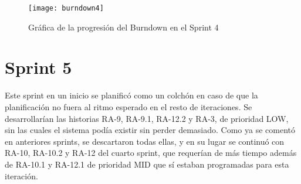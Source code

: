 \begin{figure}[h]
    \centering
    \texttt{[image: burndown4]}
    \caption[Burndown Sprint 4]{Gráfica de la progresión del Burndown en el Sprint 4}
	\label{fig:burndown4}
\end{figure}

\section{Sprint 5}

Este sprint en un inicio se planificó como un colchón en caso de que la planificación no fuera al ritmo esperado en el resto de iteraciones. Se desarrollarían las historias RA-9, RA-9.1, RA-12.2 y RA-3, de prioridad LOW, sin las cuales el sistema podía existir sin perder demasiado. Como ya se comentó en anteriores sprints, se descartaron todas ellas, y en su lugar se continuó con RA-10, RA-10.2 y RA-12 del cuarto sprint, que requerían de más tiempo además de RA-10.1 y RA-12.1 de prioridad MID que sí estaban programadas para esta iteración.

\begin{table}[H]
\label{TRA-47}
\end{table}

\begin{table}[H]
\label{TRA-48}
\end{table}

